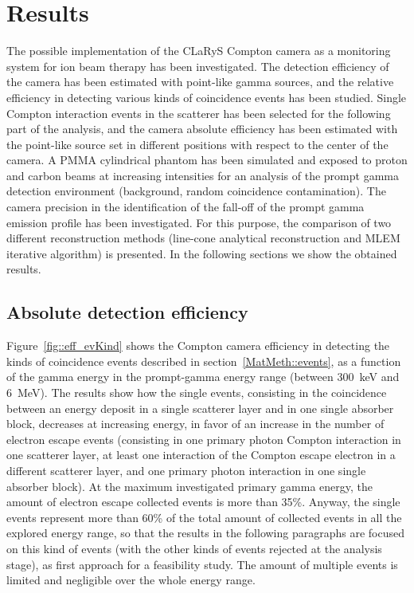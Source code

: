 \section{Results}

The possible implementation of the CLaRyS Compton camera as a monitoring system for ion beam therapy has been investigated. The detection efficiency of the camera has been estimated with point-like gamma sources, and the relative efficiency in detecting various kinds of coincidence events has been studied. Single Compton interaction events in the scatterer has been selected for the following part of the analysis, and the camera absolute efficiency has been estimated with the point-like source set in different positions with respect to the center of the camera. A PMMA cylindrical phantom has been simulated and exposed to proton and carbon beams at increasing intensities for an analysis of the prompt gamma detection environment (background, random coincidence contamination). The camera precision in the identification of the fall-off of the prompt gamma emission profile has been investigated. For this purpose, the comparison of two different reconstruction methods (line-cone analytical reconstruction and MLEM iterative algorithm) is presented. In the following sections we show the obtained results. 


\subsection{Absolute detection efficiency}
\label{Results::efficiency}
Figure~\ref{fig::eff_evKind} shows the Compton camera efficiency in detecting the kinds of coincidence events described in section~\ref{MatMeth::events}, as a function of the gamma energy in the prompt-gamma energy range (between 300~keV and 6~MeV). The results show how the single events, consisting in the coincidence between an energy deposit in a single scatterer layer and in one single absorber block, decreases at increasing energy, in favor of an increase in the number of electron escape events (consisting in one primary photon Compton interaction in one scatterer layer, at least one interaction of the Compton escape electron in a different scatterer layer, and one primary photon interaction in one single absorber block). At the maximum investigated primary gamma energy,  the amount of electron escape collected events is more than 35\%. Anyway, the single events represent more than 60\% of the total amount of collected events in all the explored energy range, so that the results in the following paragraphs are focused on this kind of events (with the other kinds of events rejected at the analysis stage), as first approach for a feasibility study. The amount of multiple events is limited and negligible over the whole energy range.

